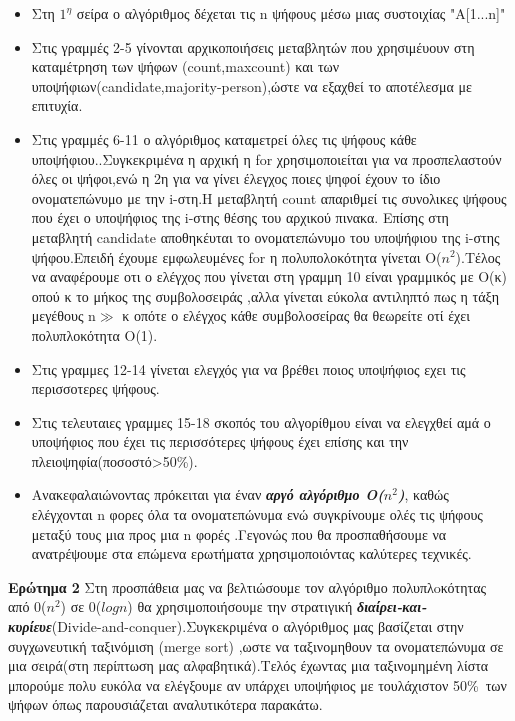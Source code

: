\documentclass[a4paper, fleqn]{article}
\begin{document}
\begin{itemize}
    \item Στη $1^η$ σείρα ο αλγόριθμος δέχεται τις n ψήφους μέσω μιας συστοιχίας "A[1...n]"

    \item Στις γραμμές 2-5 γίνονται αρχικοποιήσεις μεταβλητών που χρησιμέυουν στη καταμέτρηση των ψήφων (count,maxcount) και των υποψήφιων(candidate,majority-person),ώστε να εξαχθεί το αποτέλεσμα με επιτυχία.

    \item Στις γραμμές 6-11 ο αλγόριθμος καταμετρεί όλες τις ψήφους κάθε υποψήφιου..Συγκεκριμένα η αρχική η for χρησιμοποιείται για να προσπελαστούν όλες οι ψήφοι,ενώ η 2η για να γίνει έλεγχος ποιες ψηφοί έχουν το ίδιο ονοματεπώνυμο με την i-στη.Η μεταβλητή  count απαριθμεί τις συνολικες ψήφους που έχει ο υποψήφιος της i-στης θέσης του αρχικού πινακα. Επίσης στη μεταβλητή candidate αποθηκέυται το ονοματεπώνυμο του υποψήφιου της i-στης ψήφου.Επειδή έχουμε εμφωλευμένες for η πολυπολοκότητα γίνεται Ο($n^2$).Τέλος να αναφέρουμε οτι ο ελέγχος που γίνεται στη γραμμη 10 είναι γραμμικός με Ο(κ) οπού κ το μήκος της συμβολοσειράς ,αλλα γίνεται εύκολα αντιληπτό πως η τάξη μεγέθους n$\gg$ κ οπότε ο ελέγχος κάθε συμβολοσείρας  θα θεωρείτε οτί έχει πολυπλοκότητα Ο(1).

    \item Στις γραμμες 12-14 γίνεται  ελεγχός για να βρέθει  ποιος υποψήφιος εχει τις περισσοτερες ψήφους.

    \item Στις τελευταιες γραμμες 15-18 σκοπός του αλγορίθμου είναι να ελεγχθεί αμά ο υποψήφιος που έχει τις περισσότερες ψήφους έχει επίσης και την πλειοψηφία(ποσοστό>50\%).

    \item Aνακεφαλαιώνοντας πρόκειται για έναν\textit{\textbf{ αργό αλγόριθμο Ο($n^2$)}}, καθώς ελέγχονται n φορες όλα τα ονοματεπώνυμα ενώ συγκρίνουμε ολές τις ψήφους μεταξύ τους μια προς μια n φορές .Γεγονώς που θα προσπαθήσουμε να ανατρέψουμε στα επώμενα ερωτήματα χρησιμοποιόντας καλύτερες τεχνικές.  
\end{itemize}
\newpage

\textbf{
\color{red}Ερώτημα 2}
Στη προσπάθεια μας να βελτιώσουμε τον αλγόριθμο πολυπλoκότητας από 0($n^2$) σε 0($logn$) θα χρησιμοποιήσουμε την στρατιγική \textit{\textbf{διαίρει-και-κυρίευε}}(Divide-and-conquer).Συγκεκριμένα ο αλγόριθμος  μας βασίζεται στην συγχωνευτική ταξινόμιση (merge sort) ,ωστε να ταξινομηθουν τα ονοματεπώνυμα σε μια σειρά(στη περίπτωση μας αλφαβητικά).Τελός έχωντας μια ταξινομημένη λίστα μπορούμε πολυ ευκόλα να ελέγξουμε αν υπάρχει υποψήφιος με τουλάχιστον 50\%\ των ψήφων όπως παρουσιάζεται  αναλυτικότερα παρακάτω. 
\end{document}
